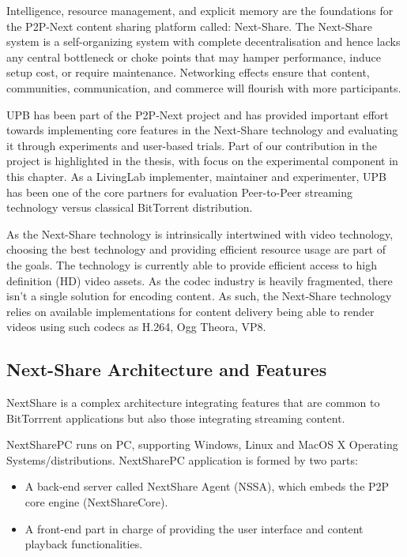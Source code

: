 Intelligence, resource management, and explicit memory are the foundations for
the P2P-Next content sharing platform called: Next-Share. The Next-Share
system is a self-organizing system with complete decentralisation and hence
lacks any central bottleneck or choke points that may hamper performance,
induce setup cost, or require maintenance. Networking effects ensure that
content, communities, communication, and commerce will flourish with more
participants.

UPB has been part of the P2P-Next project and has provided important effort
towards implementing core features in the Next-Share technology and evaluating
it through experiments and user-based trials. Part of our contribution in the
project is highlighted in the thesis, with focus on the experimental
component in this chapter. As a LivingLab implementer, maintainer and
experimenter, UPB has been one of the core partners for evaluation
Peer-to-Peer streaming technology versus classical BitTorrent distribution.

As the Next-Share technology is intrinsically intertwined with video technology,
choosing the best technology and providing efficient resource usage are part
of the goals. The technology is currently able to provide efficient access to
high definition (HD) video assets. As the codec industry is heavily
fragmented, there isn't a single solution for encoding content. As such, the
Next-Share technology relies on available implementations for content delivery
being able to render videos using such codecs as H.264, Ogg Theora, VP8.

\subsection{Next-Share Architecture and Features}
\label{subsec:multimedia-dist:nextshare-arch}

NextShare is a complex architecture integrating features that are common to
BitTorrrent applications but also those integrating streaming content.

NextSharePC runs on PC, supporting Windows, Linux and MacOS X Operating
Systems/distributions. NextSharePC application is formed by two parts:
\begin{itemize}
  \item A back-end server called NextShare Agent (NSSA), which embeds the P2P
  core engine (NextShareCore).
  \item A front-end part in charge of providing the user interface and content
  playback functionalities.
\end{itemize}

